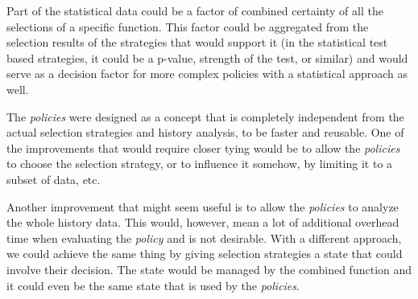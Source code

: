 Part of the statistical data could be a factor of combined certainty of all the selections of a specific function. This factor could be aggregated from the selection results of the strategies that would support it (in the statistical test based strategies, it could be a p-value, strength of the test, or similar) and would serve as a decision factor for more complex policies with a statistical approach as well.

The \textit{policies} were designed as a concept that is completely independent from the actual selection strategies and history analysis, to be faster and reusable. One of the improvements that would require closer tying would be to allow the \textit{policies} to choose the selection strategy, or to influence it somehow, by limiting it to a subset of data, etc. 

Another improvement that might seem useful is to allow the \textit{policies} to analyze the whole history data. This would, however, mean a lot of additional overhead time when evaluating the \textit{policy} and is not desirable.
With a different approach, we could achieve the same thing by giving selection strategies a state that could involve their decision. The state would be managed by the combined function and it could even be the same state that is used by the \textit{policies}. 

